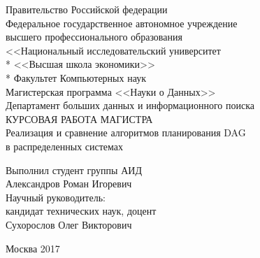 \begin{titlepage}
\newpage
\begin{center}
\Large
Правительство Российской федерации\\
Федеральное государственное автономное учреждение\\
высшего профессионального образования\\
\LARGE
<<Национальный исследовательский университет \\*
<<Высшая школа экономики>>\\*
\Large
\vspace{1.5cm}
Факультет Компьютерных наук\\
Магистерская программа <<Науки о Данных>>\\
Департамент больших данных и информационного поиска \\
\vspace{2.5cm}
КУРСОВАЯ РАБОТА МАГИСТРА\\
Реализация и сравнение алгоритмов планирования DAG\\ в распределенных системах
\\
\end{center}

\vspace{5cm} 
\begin{flushright}
\Large
Выполнил студент группы АИД\ \ \ \ \ \ \ \ \ \\
Александров Роман Игоревич \ \ \ \ \ \ \ \ \ \ \ \\
\vspace{1.5cm}
Научный руководитель: \ \ \ \ \ \ \ \ \  \ \ \ \ \ \ \ \ \ \ \\
кандидат технических наук, доцент \ \ \ \\
Сухорослов Олег Викторович \ \ \ \ \ \ \ \ \ \ \ \\ 
\end{flushright}
 
\vspace{\fill}
\begin{center}
Москва 2017
\end{center}

\end{titlepage}